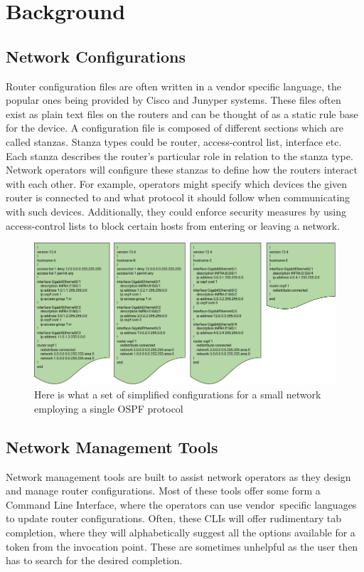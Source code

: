 \section{Background}

\subsection{Network Configurations} 

Router configuration files are often written in a vendor specific language, the popular ones being provided by Cisco and Junyper systems. These files often exist as plain text files on the routers and can be thought of as a static rule base for the device. A configuration file is composed of different sections which are called stanzas. Stanza types could be router, access-control list, interface etc. Each stanza describes the router's particular role in relation to the stanza type. Network operators will configure these stanzas to define how the routers interact with each other. For example, operators might specify which devices the given router is connected to and what protocol it should follow when communicating with such devices. Additionally, they could enforce security measures by using access-control lists to block certain hosts from entering or leaving a network. 

\begin{figure}[H]
	\centering
	\includegraphics[width=5in]{configexample.png}
	\caption{Here is what a set of simplified configurations for a small network employing a single OSPF protocol}
\end{figure}

\subsection{Network Management Tools}

Network management tools are built to assist network operators as they design and manage router configurations. Most of these tools offer some form a Command Line Interface, where the operators can use vendor  specific languages to update router configurations. Often, these CLIs will offer rudimentary tab completion, where they will alphabetically suggest all the options available for a token from the invocation point. These are sometimes unhelpful as the user then has to search for the desired completion.\\ 

